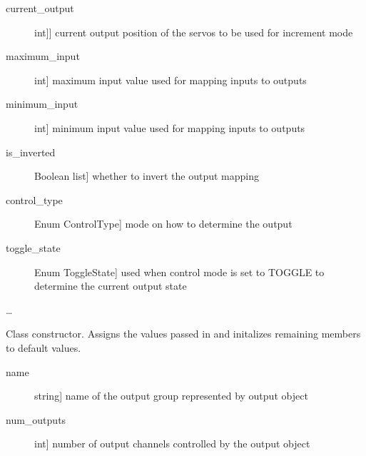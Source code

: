 \documentclass[letterpaper,10pt,english]{sphinxmanual}
\begin{document}
\begin{fulllineitems}
\begin{description}
\item[{current\_output}] \leavevmode{[}{[}int{]}{]}
\sphinxAtStartPar
current output position of the servos to be used for increment mode

\item[{maximum\_input}] \leavevmode{[}int{]}
\sphinxAtStartPar
maximum input value used for mapping inputs to outputs

\item[{minimum\_input}] \leavevmode{[}int{]}
\sphinxAtStartPar
minimum input value used for mapping inputs to outputs

\item[{is\_inverted}] \leavevmode{[}Boolean list{]}
\sphinxAtStartPar
whether to invert the output mapping

\item[{control\_type}] \leavevmode{[}Enum ControlType{]}
\sphinxAtStartPar
mode on how to determine the output

\item[{toggle\_state}] \leavevmode{[}Enum ToggleState{]}
\sphinxAtStartPar
used when control mode is set to TOGGLE to determine the current output state

\end{description}

\sphinxAtStartPar
…

\sphinxAtStartPar
{}

\begin{fulllineitems}
\label{\detokenize{generic:DigitalOutputObject.DigitalOutputObject.__init__}}
\sphinxAtStartPar
Class constructor. Assigns the values passed in and initalizes remaining members to default values.

\sphinxAtStartPar
{}
\begin{description}
\item[{name}] \leavevmode{[}string{]}
\sphinxAtStartPar
name of the output group represented by output object

\item[{num\_outputs}] \leavevmode{[}int{]}
\sphinxAtStartPar
number of output channels controlled by the output object


\end{description}
\end{fulllineitems}
\end{fulllineitems}
\end{document}
